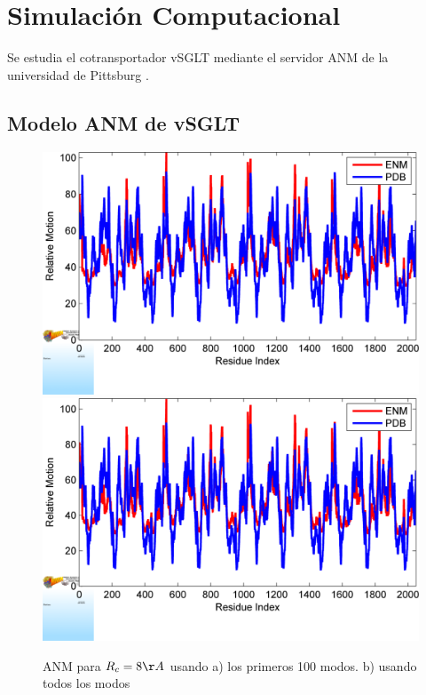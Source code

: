 \chapter{Simulaci\'{o}n Computacional}
Se estudia el cotransportador vSGLT mediante el servidor ANM de la universidad de Pittsburg \cite{Eyal2015}. 
\section{Modelo ANM de vSGLT}
\begin{figure}
 \centering
  \includegraphics[scale=0.3]{./Kap4/ANM/Ca/BF_plot_100.png}
 \includegraphics[scale=0.3]{./Kap4/ANM/Ca/BF_plot.png}
 \caption{ANM para $R_c=8\AA$ usando a) los primeros 100 modos. b) usando todos los modos}
\end{figure}
